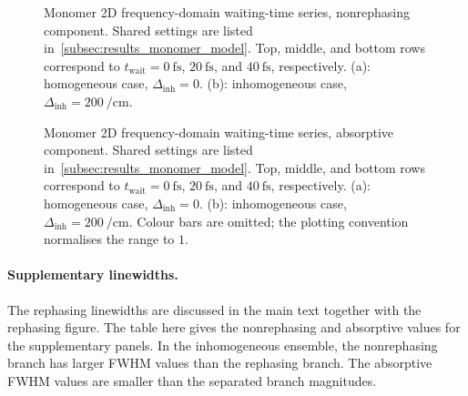 \begin{figure}[htbp]
    \centering
    \caption{Monomer 2D frequency-domain waiting-time series, nonrephasing
    component. Shared settings are listed
    in~\autoref{subsec:results_monomer_model}. Top, middle, and bottom rows correspond to
    \(t_{\mathrm{wait}}=\SI{0}{\femto\second}\),
    \(\SI{20}{\femto\second}\), and \(\SI{40}{\femto\second}\),
    respectively. (a): homogeneous case,
    \(\Delta_{\mathrm{inh}}=0\). (b): inhomogeneous case,
    \(\Delta_{\mathrm{inh}}=\SI{200}{\per\centi\metre}\).}
    \label{fig:app_monomer_2d_freq_hom_inhom_nonrephasing}
\end{figure}

\begin{figure}[htbp]
    \centering
    \caption{Monomer 2D frequency-domain waiting-time series, absorptive
    component. Shared settings are listed
    in~\autoref{subsec:results_monomer_model}. Top, middle, and bottom rows correspond to
    \(t_{\mathrm{wait}}=\SI{0}{\femto\second}\),
    \(\SI{20}{\femto\second}\), and \(\SI{40}{\femto\second}\),
    respectively. (a): homogeneous case,
    \(\Delta_{\mathrm{inh}}=0\). (b): inhomogeneous case,
    \(\Delta_{\mathrm{inh}}=\SI{200}{\per\centi\metre}\). Colour bars are
    omitted; the plotting convention normalises the range to \(1\).}
    \label{fig:app_monomer_2d_freq_hom_inhom_absorptive}
\end{figure}

\paragraph{Supplementary linewidths.}
The rephasing linewidths are discussed in the main text together with the
rephasing figure. The table here gives the nonrephasing and absorptive values
for the supplementary panels. In the inhomogeneous ensemble, the nonrephasing
branch has larger FWHM values than the rephasing branch. The absorptive FWHM
values are smaller than the separated branch magnitudes.

